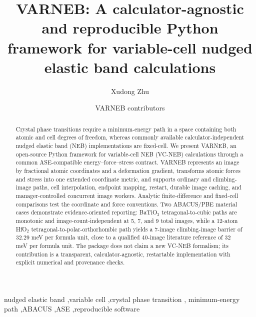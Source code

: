 \documentclass[final,3p,times]{elsarticle}
\begin{document}
\begin{frontmatter}
\title{VARNEB: A calculator-agnostic and reproducible Python framework for variable-cell nudged elastic band calculations}

\author[a]{Xudong Zhu}
\author[a]{VARNEB contributors}
\address[a]{Affiliation and postal address to be confirmed before submission}

\begin{abstract}
Crystal phase transitions require a minimum-energy path in a space containing
both atomic and cell degrees of freedom, whereas commonly available
calculator-independent nudged elastic band (NEB) implementations are
fixed-cell. We present VARNEB, an open-source Python framework for
variable-cell NEB (VC-NEB) calculations through a common ASE-compatible
energy--force--stress contract. VARNEB represents an image by fractional
atomic coordinates and a deformation gradient, transforms atomic forces and
stress into one extended coordinate metric, and supports ordinary and
climbing-image paths, cell interpolation, endpoint mapping, restart, durable
image caching, and manager-controlled concurrent image workers. Analytic
finite-difference and fixed-cell comparisons test the coordinate and force
conventions. Two ABACUS/PBE material cases demonstrate evidence-oriented
reporting: BaTiO$_3$ tetragonal-to-cubic paths are monotonic and
image-count-independent at 5, 7, and 9 total images, while a 12-atom HfO$_2$
tetragonal-to-polar-orthorhombic path yields a 7-image climbing-image barrier
of 32.29 meV per formula unit, close to a qualified 40-image literature
reference of 32 meV per formula unit. The package does not claim a new
VC-NEB formalism; its contribution is a transparent, calculator-agnostic,
restartable implementation with explicit numerical and provenance checks.
\end{abstract}

\begin{keyword}
nudged elastic band \sep variable cell \sep crystal phase transition \sep
minimum-energy path \sep ABACUS \sep ASE \sep reproducible software
\end{keyword}
\end{frontmatter}
\end{document}
